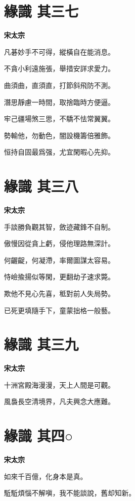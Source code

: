 \documentclass[12pt,a4paper]{ctexbook}
\begin{document}
\section{緣識  其三七}
\textbf{宋太宗}\par\vspace{0.5em}
凡碁妙手不可得，縱橫自在能消息。\par
不貪小利遠施張，舉措安詳求愛力。\par
曲須曲，直須直，打節斜飛防不測。\par
潛思靜慮一時間，取捨臨時方便逼。\par
牢己疆場煞三思，不驕不怯常翼翼。\par
勢輸他，勿動色，闇設機籌倍雅飾。\par
恒持自固最爲强，尤宜閑暇心先抑。\par

\section{緣識  其三八}
\textbf{宋太宗}\par\vspace{0.5em}
手談勝負觀其智，斂迹藏鋒不自制。\par
傲慢因從貪上虧，侵他理路無深計。\par
何齷齪，何凝滯，率爾圖謀太容易。\par
恃嶮揄揚似等閑，更翻劫子速求斃。\par
欺他不見心先喜，秪對前人失局勢。\par
已死更填隨手下，童蒙拙格一般藝。\par

\section{緣識  其三九}
\textbf{宋太宗}\par\vspace{0.5em}
十洲宮殿海漫漫，天上人間是可觀。\par
風裊長空清境界，凡夫興念大應難。\par

\section{緣識  其四○}
\textbf{宋太宗}\par\vspace{0.5em}
如來千百億，化身本是真。\par
駈駈煩惱不解嗔，我不能談說，舊却知新。\par
\end{document}
